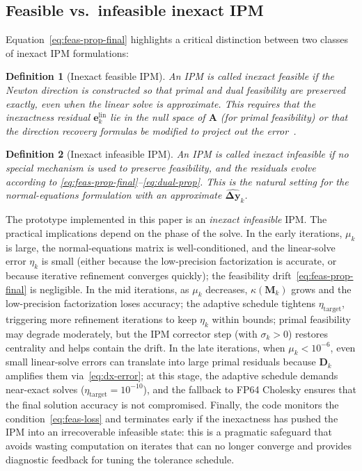 \documentclass[11pt,twoside]{article}
\newtheorem{definition}{Definition}[section]
\newcommand{\bA}{\mathbf{A}}
\newcommand{\by}{\mathbf{y}}
\newcommand{\bD}{\mathbf{D}}
\newcommand{\be}{\mathbf{e}}
\newcommand{\bM}{\mathbf{M}}
\newcommand{\bDelta}{\mathbf{\Delta}}
\begin{document}
\subsection{Feasible vs.\ infeasible inexact IPM}
\label{sec:feas-vs-infeas}

Equation~\eqref{eq:feas-prop-final} highlights a critical distinction
between two classes of inexact IPM formulations:

\begin{definition}[Inexact feasible IPM]
  An IPM is called \emph{inexact feasible} if the Newton direction is
  constructed so that primal and dual feasibility are preserved exactly,
  even when the linear solve is approximate.  This requires that the
  inexactness residual $\be_k^{\text{lin}}$ lie in the null space of
  $\bA$ (for primal feasibility) or that the direction recovery
  formulas be modified to project out the error~\cite{Kerenidis2020}.
\end{definition}

\begin{definition}[Inexact infeasible IPM]
  An IPM is called \emph{inexact infeasible} if no special mechanism is
  used to preserve feasibility, and the residuals evolve according to
  \eqref{eq:feas-prop-final}--\eqref{eq:dual-prop}.  This is the natural
  setting for the normal-equations formulation with an approximate
  $\widehat{\bDelta\by}_k$.
\end{definition}

The prototype implemented in this paper is an \emph{inexact infeasible}
IPM.  The practical implications depend on the phase of the solve.  In the
early iterations, $\mu_k$ is large, the normal-equations matrix is
well-conditioned, and the linear-solve error $\eta_k$ is small (either
because the low-precision factorization is accurate, or because iterative
refinement converges quickly); the feasibility
drift~\eqref{eq:feas-prop-final} is negligible.  In the mid iterations, as
$\mu_k$ decreases, $\kappa(\bM_k)$ grows and the low-precision
factorization loses accuracy; the adaptive schedule tightens
$\eta_{\text{target}}$, triggering more refinement iterations to keep
$\eta_k$ within bounds; primal feasibility may degrade moderately, but the
IPM corrector step (with $\sigma_k > 0$) restores centrality and helps
contain the drift.  In the late iterations, when $\mu_k < 10^{-6}$, even
small linear-solve errors can translate into large primal residuals because
$\bD_k$ amplifies them via~\eqref{eq:dx-error}; at this stage, the
adaptive schedule demands near-exact solves ($\eta_{\text{target}} =
10^{-10}$), and the fallback to FP64 Cholesky ensures that the final
solution accuracy is not compromised.  Finally, the code monitors the
condition~\eqref{eq:feas-loss} and terminates early if the inexactness has
pushed the IPM into an irrecoverable infeasible state: this is a pragmatic
safeguard that avoids wasting computation on iterates that can no longer
converge and provides diagnostic feedback for tuning the tolerance
schedule.
\end{document}
